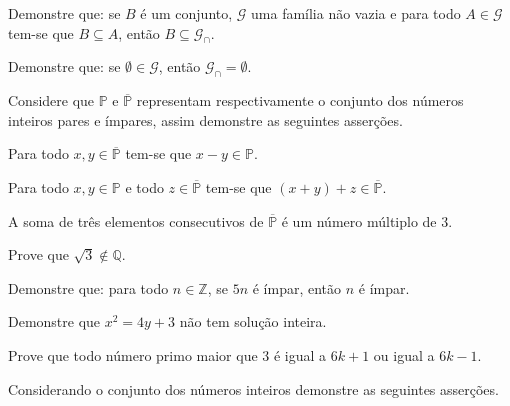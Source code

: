 \begin{problem}\label{prob:Demosntracoes6}
	Demonstre que: se $B$ é um conjunto, $\mathcal{G}$ uma família não vazia e para todo $A \in \mathcal{G}$ tem-se que $B \subseteq A$, então $B \subseteq \mathcal{G}_{\cap}$.
\end{problem}

\begin{problem}\label{prob:Demosntracoes7}
	Demonstre que: se $\emptyset \in \mathcal{G}$, então $\mathcal{G}_{\cap} = \emptyset$.
\end{problem}

\begin{problem}\label{prob:Demosntracoes8}
	Considere que $\mathbb{P}$ e $\overline{\mathbb{P}}$ representam respectivamente o conjunto dos números inteiros pares e ímpares, assim demonstre as seguintes asserções. 
\end{problem}

\begin{exerList}
	\item Para todo $x, y \in \overline{\mathbb{P}}$ tem-se que $x - y \in \mathbb{P}$.
	\item Para todo $x, y\in \mathbb{P}$ e todo $z \in \overline{\mathbb{P}}$ tem-se que $(x + y) + z \in \overline{\mathbb{P}}$.
	\item A soma de três elementos consecutivos de $\overline{\mathbb{P}}$ é um número múltiplo de $3$.
\end{exerList}

\begin{problem}\label{prob:Demosntracoes9}
	Prove que $\sqrt{3} \notin \mathbb{Q}$.
\end{problem}

\begin{problem}\label{prob:Demosntracoes10}
	Demonstre que: para todo $n \in \mathbb{Z}$, se $5n$ é ímpar, então $n$ é ímpar.
\end{problem}

\begin{problem}\label{prob:Demosntracoes11}
	Demonstre que $x^2 = 4y + 3$ não tem solução inteira.
\end{problem}

\begin{problem}\label{prob:Demosntracoes12}
	Prove que todo número primo maior que $3$ é igual a $6k+1$ ou igual a $6k-1$.
\end{problem}

\begin{problem}\label{prob:Demosntracoes13}
	Considerando o conjunto dos números inteiros demonstre as seguintes asserções.
\end{problem}


